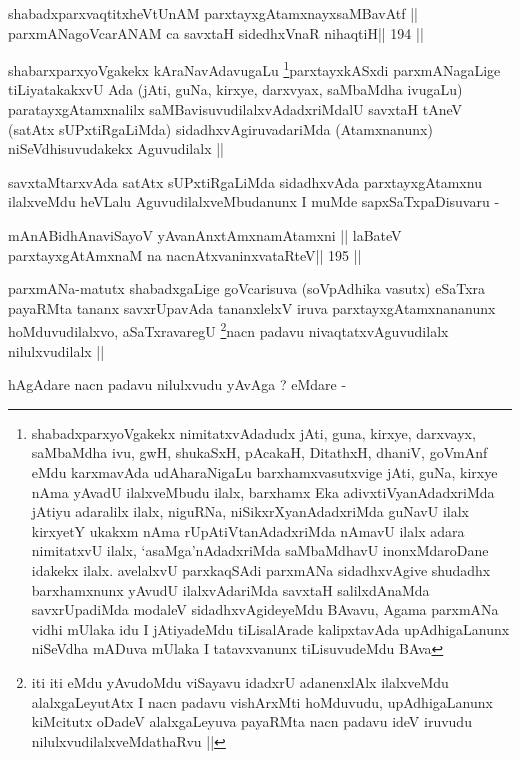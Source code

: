 \begin{shl}
shabadxparxvaqtitxheVtUnAM parxtayxgAtamxnayxsaMBavAtf ||
parxmANagoVcarANAM ca savxtaH sidedhxVnaR nihaqtiH\hfill || 194 ||
\end{shl}

\begin{artha}
shabarxparxyoVgakekx
kAraNavAdavugaLu \footnote[1]{shabadxparxyoVgakekx nimitatxvAdadudx
  jAti, guna, kirxye, darxvayx, saMbaMdha ivu, gwH, shukaSxH, pAcakaH,
DitathxH, dhaniV, goVmAnf eMdu karxmavAda udAharaNigaLu
barxhamxvasutxvige jAti, guNa, kirxye nAma yAvadU ilalxveMbudu ilalx,
barxhamx Eka adivxtiVyanAdadxriMda jAtiyu adaralilx ilalx, niguRNa,
niSikxrXyanAdadxriMda guNavU ilalx kirxyetY ukakxm nAma
rUpAtiVtanAdadxriMda nAmavU ilalx adara nimitatxvU ilalx,
`asaMga'nAdadxriMda saMbaMdhavU inonxMdaroDane idakekx
ilalx. avelalxvU parxkaqSAdi parxmANa sidadhxvAgive shudadhx
barxhamxnunx yAvudU ilalxvAdariMda savxtaH salilxdAnaMda savxrUpadiMda
modaleV sidadhxvAgideyeMdu BAvavu, Agama parxmANa vidhi mUlaka idu I
jAtiyadeMdu tiLisalArade kalipxtavAda upAdhigaLanunx niSeVdha mADuva
mUlaka I tatavxvanunx tiLisuvudeMdu BAva}parxtayxkASxdi
parxmANagaLige tiLiyatakakxvU Ada (jAti, guNa, kirxye, darxvyax,
saMbaMdha ivugaLu) paratayxgAtamxnalilx saMBavisuvudilalxvAdadxriMdalU
savxtaH tAneV (satAtx sUPxtiRgaLiMda) sidadhxvAgiruvadariMda
(Atamxnanunx) niSeVdhisuvudakekx Aguvudilalx ||
\end{artha}

\begin{artha}
savxtaMtarxvAda satAtx sUPxtiRgaLiMda sidadhxvAda parxtayxgAtamxnu
ilalxveMdu heVLalu AguvudilalxveMbudanunx I muMde sapxSaTxpaDisuvaru -
\end{artha}

\begin{shl}
mAnABidhAnaviSayoV yAvanAnx\s\s tAmxnamAtamxni ||
laBateV parxtayxgAtAmxnaM na nacnAtxvaninxvataRteV\hfill || 195 ||
\end{shl}

\begin{artha}
parxmANa-matutx shabadxgaLige goVcarisuva (soVpAdhika vasutx) eSaTxra
payaRMta tananx savxrUpavAda tananxlelxV iruva parxtayxgAtamxnananunx
hoMduvudilalxvo, aSaTxravaregU \footnote[2]{iti iti eMdu yAvudoMdu
  viSayavu idadxrU adanenxlAlx ilalxveMdu alalxgaLeyutAtx I nacn
  padavu vishArxMti hoMduvudu, upAdhigaLanunx kiMcitutx oDadeV
  alalxgaLeyuva payaRMta nacn padavu ideV iruvudu
  nilulxvudilalxveMdathaRvu ||}nacn padavu
nivaqtatxvAguvudilalx nilulxvudilalx ||

hAgAdare nacn padavu nilulxvudu yAvAga ? eMdare -
\end{artha}

